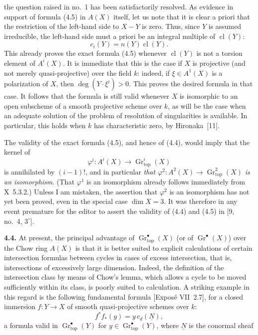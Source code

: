 \documentclass[11pt]{article}
\newcommand{\Gtop}{\operatorname{Gr}_{\mathrm{top}}}
\newcommand{\cl}{\operatorname{cl}}
\begin{document}
the question raised in no.~1 has been satisfactorily resolved. As evidence
in support of formula (4.5) in $A(X)$ itself, let us note that it is clear a
priori that the restriction of the left-hand side to $X-Y$ is zero. Thus,
since $Y$ is assumed irreducible, the left-hand side must a priori be an
integral multiple of $\cl(Y)$:
\[
 c_i(Y)=n(Y)\cl(Y).
\]
This already proves the exact formula (4.5) whenever $\cl(Y)$ is not a
torsion element of $A^i(X)$. It is immediate that this is the case if $X$ is
projective (and not merely quasi-projective) over the field $k$: indeed, if
$\xi\in A^1(X)$ is a polarization of $X$, then
$\deg(Y\mathbin{\cdot}\xi^i)>0$. This proves the desired formula in that
case. It follows that the formula is still valid whenever $X$ is isomorphic
to an open subscheme of a smooth projective scheme over $k$, as will be the
case when an adequate solution of the problem of resolution of
singularities is available. In particular, this holds when $k$ has
characteristic zero, by Hironaka~[11].

The validity of the exact formula (4.5), and hence of (4.4), would imply that
the kernel of
\[
 \varphi^i:A^i(X)\longrightarrow\Gtop^i(X)
\]
is annihilated by $(i-1)!$, and in particular \emph{that
$\varphi^2:A^2(X)\to\Gtop^2(X)$ is an isomorphism}. (That $\varphi^1$ is an
isomorphism already follows immediately from X~5.3.2.) Unless I am
mistaken, the assertion that $\varphi^2$ is an isomorphism has not yet been
proved, even in the special case $\dim X=3$. It was therefore in any event
premature for the editor to assert the validity of (4.4) and (4.5) in
[9, no.~4, $3^\circ$].

\noindent\textbf{4.4.}
At present, the principal advantage of $\Gtop^\bullet(X)$ (or of
$\operatorname{Gr}^\bullet(X)$) over the Chow ring $A(X)$ is that it is
better suited to explicit calculations of certain intersection formulas
between cycles in cases of excess intersection, that is, intersections of
excessively large dimension. Indeed, the definition of the intersection
class by means of Chow's lemma, which allows a cycle to be moved sufficiently
within its class, is poorly suited to calculation. A striking example in
this regard is the following fundamental formula [Exposé VII~2.7], for a
closed immersion $f:Y\to X$ of smooth quasi-projective schemes over $k$:
\begin{equation*}\tag{4.6}
 f^*f_*(y)=y\,c_d(\underline{N}),
\end{equation*}
a formula valid in $\Gtop^\bullet(Y)$ for $y\in\Gtop^\bullet(Y)$, where
$\underline{N}$ is the conormal sheaf
\end{document}
